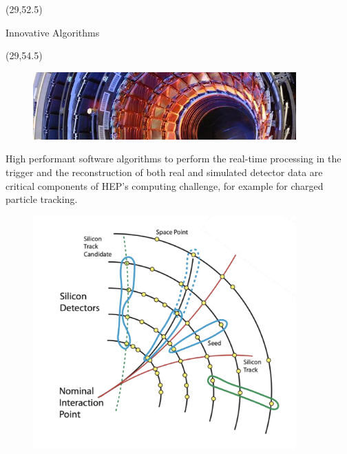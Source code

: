 \begin{textblock}{25.0}(29,52.5)
\begin{block}{Innovative Algorithms}
\begin{textblock}{25.0}(29,54.5)
\begin{figure}[tbph]
\centering
\includegraphics[width=0.90\textwidth]{images/0610026_01-A5-at-72-dpi-slice.jpg}
\end{figure}
High performant software algorithms to perform the real-time processing in the trigger and the reconstruction of both real and simulated detector data are critical components of HEP’s computing challenge, for example for charged particle tracking. 
\begin{figure}[tbph]
\centering
\includegraphics[width=0.90\textwidth]{images/trackreco-graphic.png}
\end{figure}
\end{textblock}
\end{block}
\end{textblock}
